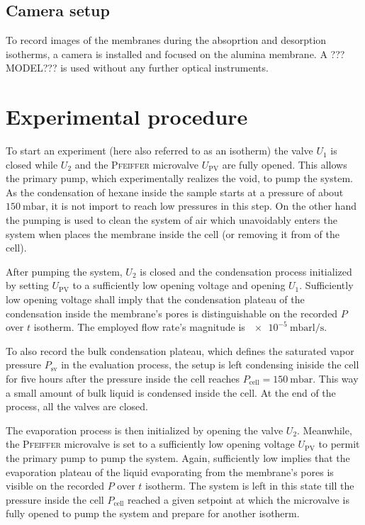 \documentclass[../thesis.tex]{subfiles}
\begin{document}
              


            \subsection{Camera setup}
            \label{subsec:camera-setup}

              To record images of the membranes during the absoprtion and desorption isotherms, a camera is installed and focused on the alumina membrane. A ???MODEL??? is used without any further optical instruments.


    \section{Experimental procedure}
            \label{sec:experimental-procedure}

                To start an experiment (here also referred to as an isotherm) the valve $U_1$ is closed while $U_2$ and the \textsc{Pfeiffer} microvalve $U_\mathrm{PV}$ are fully opened. This allows the primary pump, which experimentally realizes the void, to pump the system. As the condensation of hexane inside the sample starts at a pressure of about $\SI{150}{\milli\bar}$, it is not import to reach low pressures in this step. On the other hand the pumping is used to clean the system of air which unavoidably enters the system when places the membrane inside the cell (or removing it from of the cell).

                After pumping the system, $U_2$ is closed and the condensation process initialized by setting $U_\mathrm{PV}$ to a sufficiently low opening voltage and opening $U_1$. Sufficiently low opening voltage shall imply that the condensation plateau of the condensation inside the membrane's pores is distinguishable on the recorded $P$ over $t$ isotherm. The employed flow rate's magnitude is  $\SI{e-5}{\milli\bar\litre\per\second}$.

                To also record the bulk condensation plateau, which defines the saturated vapor pressure $P_\mathrm{sv}$ in the evaluation process, the setup is left condensing iniside the cell for five hours after the pressure inside the cell reaches $P_\mathrm{cell} = \SI{150}{\milli\bar}$. This way a small amount of bulk liquid is condensed inside the cell. At the end of the process, all the valves are closed.

                The evaporation process is then initialized by opening the valve $U_2$. Meanwhile, the \textsc{Pfeiffer} microvalve is set to a sufficiently low opening voltage $U_\mathrm{PV}$ to permit the primary pump to pump the system. Again, sufficiently low implies that the evaporation plateau of the  liquid evaporating from the membrane's pores is visible on the recorded $P$ over $t$ isotherm. The system is left in this state till the pressure inside the cell $P_\mathrm{cell}$ reached a given setpoint at which the microvalve is fully opened to pump the system and prepare for another isotherm.
\end{document}
